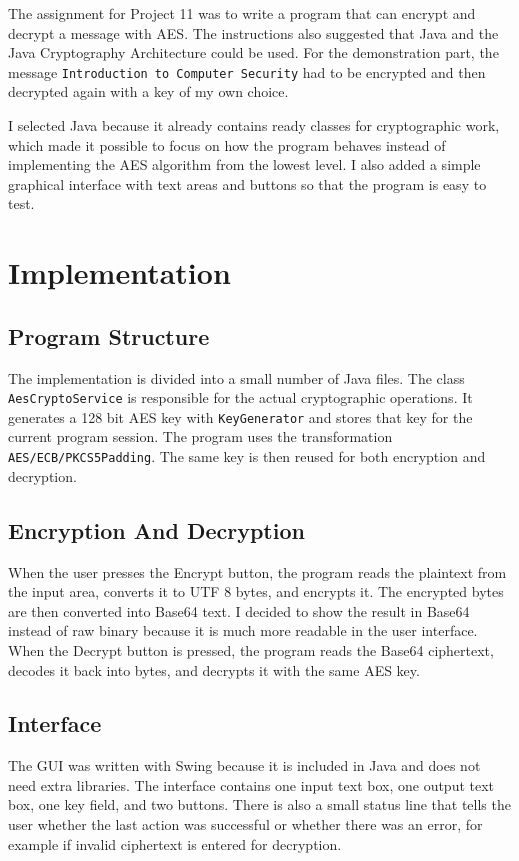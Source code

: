 \documentclass[12pt,a4paper]{article}
\begin{document}
The assignment for Project 11 was to write a program that can encrypt and decrypt a message with AES. The instructions also suggested that Java and the Java Cryptography Architecture could be used. For the demonstration part, the message \texttt{Introduction to Computer Security} had to be encrypted and then decrypted again with a key of my own choice.

I selected Java because it already contains ready classes for cryptographic work, which made it possible to focus on how the program behaves instead of implementing the AES algorithm from the lowest level. I also added a simple graphical interface with text areas and buttons so that the program is easy to test.

\section{Implementation}
\subsection{Program Structure}
The implementation is divided into a small number of Java files. The class \texttt{AesCryptoService} is responsible for the actual cryptographic operations. It generates a 128 bit AES key with \texttt{KeyGenerator} and stores that key for the current program session. The program uses the transformation \texttt{AES/ECB/\allowbreak PKCS5Padding}. The same key is then reused for both encryption and decryption.

\subsection{Encryption And Decryption}
When the user presses the Encrypt button, the program reads the plaintext from the input area, converts it to UTF 8 bytes, and encrypts it. The encrypted bytes are then converted into Base64 text. I decided to show the result in Base64 instead of raw binary because it is much more readable in the user interface. When the Decrypt button is pressed, the program reads the Base64 ciphertext, decodes it back into bytes, and decrypts it with the same AES key.

\subsection{Interface}
The GUI was written with Swing because it is included in Java and does not need extra libraries. The interface contains one input text box, one output text box, one key field, and two buttons. There is also a small status line that tells the user whether the last action was successful or whether there was an error, for example if invalid ciphertext is entered for decryption.
\end{document}
